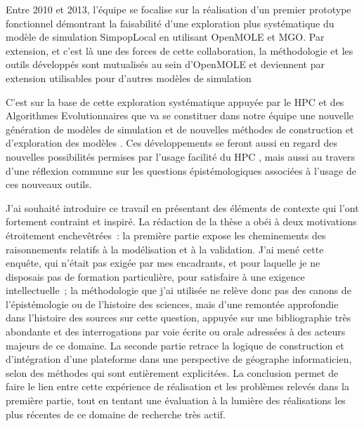 Entre 2010 et 2013, l'équipe se focalise sur la réalisation d'un premier prototype fonctionnel démontrant la faisabilité d'une exploration plus systématique du modèle de simulation SimpopLocal en utilisant OpenMOLE et MGO. Par extension, et c'est là une des forces de cette collaboration, la méthodologie et les outils développés sont mutualisés au sein d'OpenMOLE et deviennent par extension utilisables pour d'autres modèles de simulation \autocites{Schmitt2014, Reuillon2015} 
 
C'est sur la base de cette exploration systématique appuyée par le HPC et des Algorithmes Evolutionnaires que va se constituer dans notre équipe une nouvelle génération de modèles de simulation et de nouvelles méthodes de construction et d'exploration des modèles \autocites{Cottineau2015,Cottineau2014b,Cottineau2014a,Cherel2015,Reuillon2015, Schmitt2015, Schmitt2014}⁠. Ces développements se feront aussi en regard des nouvelles possibilités permises par l'usage facilité du HPC \autocites{Turton1998,Openshaw2000}⁠, mais aussi au travers d'une réflexion commune sur les questions épistémologiques associées à l'usage de ces nouveaux outils. 

J’ai souhaité introduire ce travail en présentant des éléments de contexte qui l’ont fortement contraint et inspiré. La rédaction de la thèse a obéi à deux motivations étroitement enchevêtrées : la première partie expose les cheminements des raisonnements relatifs à la modélisation et à la validation. J’ai mené cette enquête, qui n’était pas exigée par mes encadrants, et pour laquelle je ne disposais pas de formation particulière, pour satisfaire à une exigence intellectuelle ; la méthodologie que j’ai utilisée ne relève donc pas des canons de l’épistémologie ou de l’histoire des sciences, mais d’une remontée approfondie dans l’histoire des sources sur cette question, appuyée sur une bibliographie très abondante et des interrogations par voie écrite ou orale adressées à des acteurs majeurs de ce domaine. La seconde partie retrace la logique de construction et d’intégration d’une plateforme dans une perspective de géographe informaticien, selon des méthodes qui sont entièrement explicitées. La conclusion permet de faire le lien entre cette expérience de réalisation et les problèmes relevés dans la première partie, tout en tentant une évaluation à la lumière des réalisations les plus récentes de ce domaine de recherche très actif. 